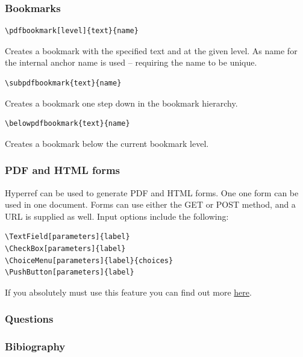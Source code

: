 \documentclass[10pt]{beamer}
\begin{document}
\begin{frame}[fragile]
\frametitle{Bookmarks}
\begin{verbatim}\pdfbookmark[level]{text}{name}
\end{verbatim}
Creates a bookmark with the specified text and at the given level. As name for the internal anchor name is used -- requiring the name to be unique. 
\\[10pt]
\begin{verbatim}\subpdfbookmark{text}{name}
\end{verbatim}
Creates a bookmark one step down in the bookmark hierarchy.
\\[10pt]
\begin{verbatim}\belowpdfbookmark{text}{name}
\end{verbatim} 
Creates a bookmark below the current bookmark level. 
\end{frame}

\begin{frame}[fragile]
\frametitle{PDF and HTML forms}
Hyperref can be used to generate PDF and HTML forms. One one form can be used in one document. Forms can use either the GET or POST method, and a URL is supplied as well. Input options include the following:
\begin{verbatim}
\TextField[parameters]{label}
\CheckBox[parameters]{label}
\ChoiceMenu[parameters]{label}{choices}
\PushButton[parameters]{label}
\end{verbatim}
If you absolutely must use this feature you can find out more \href{http://tug.ctan.org/tex-archive/macros/latex/contrib/hyperref/doc/manual.html#x1-190006}{here}.
\end{frame}

\begin{frame}[fragile]
\frametitle{Questions}
\end{frame}

\begin{frame}[fragile]
\frametitle{Bibiography}


\end{frame}
\end{document}

